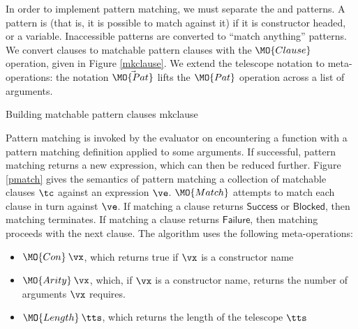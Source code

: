 
In order to implement pattern matching, we must separate the  and
 patterns. A pattern is  (that is, it is possible
to match against it) if it is constructor headed, or a variable. Inaccessible patterns
are converted to ``match anything'' patterns. We convert clauses to matchable pattern
clauses with the $\MO{Clause}$ operation, given in Figure \ref{mkclause}.
We extend the telescope notation to meta-operations: the notation $\vec{\MO{Pat}}$ lifts the
$\MO{Pat}$ operation across a list of arguments.

{Building matchable pattern clauses}
{mkclause}



\newcommand{\Blocked}{\mathsf{Blocked}}
\newcommand{\Success}{\mathsf{Success}}
\newcommand{\Failure}{\mathsf{Failure}}

Pattern matching is invoked by the evaluator on encountering a function with
a pattern matching definition applied to some arguments. If successful, pattern
matching returns a new expression, which can then be reduced further.
Figure \ref{pmatch} gives the semantics of pattern matching a collection of 
matchable clauses
$\tc$ against an expression $\ve$. $\MO{Match}$ attempts to match each clause in
turn against $\ve$. If matching a clause returns $\Success$ or $\Blocked$, then
matching terminates. If matching a clause returns $\Failure$, then matching proceeds
with the next clause. The algorithm uses the following meta-operations:

\begin{itemize}
\item $\MO{Con}\:\vx$, which returns true if $\vx$ is a constructor name
\item $\MO{Arity}\:\vx$, which, if $\vx$ is a constructor name, returns the number of arguments
$\vx$ requires.
\item $\MO{Length}\:\tts$, which returns the length of the telescope $\tts$
\end{itemize}



